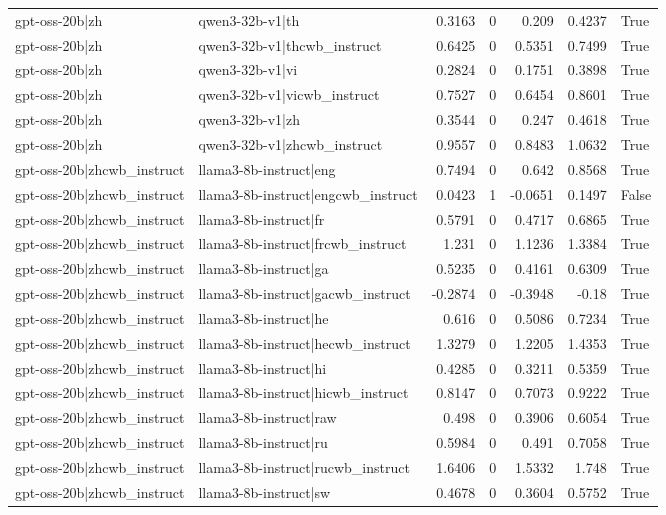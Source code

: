 \begin{table}
\begin{tabular}{l l r r r r l}
gpt-oss-20b|zh & qwen3-32b-v1|th & 0.3163 & 0 & 0.209 & 0.4237 & True \\
gpt-oss-20b|zh & qwen3-32b-v1|thcwb_instruct & 0.6425 & 0 & 0.5351 & 0.7499 & True \\
gpt-oss-20b|zh & qwen3-32b-v1|vi & 0.2824 & 0 & 0.1751 & 0.3898 & True \\
gpt-oss-20b|zh & qwen3-32b-v1|vicwb_instruct & 0.7527 & 0 & 0.6454 & 0.8601 & True \\
gpt-oss-20b|zh & qwen3-32b-v1|zh & 0.3544 & 0 & 0.247 & 0.4618 & True \\
gpt-oss-20b|zh & qwen3-32b-v1|zhcwb_instruct & 0.9557 & 0 & 0.8483 & 1.0632 & True \\
gpt-oss-20b|zhcwb_instruct & llama3-8b-instruct|eng & 0.7494 & 0 & 0.642 & 0.8568 & True \\
gpt-oss-20b|zhcwb_instruct & llama3-8b-instruct|engcwb_instruct & 0.0423 & 1 & -0.0651 & 0.1497 & False \\
gpt-oss-20b|zhcwb_instruct & llama3-8b-instruct|fr & 0.5791 & 0 & 0.4717 & 0.6865 & True \\
gpt-oss-20b|zhcwb_instruct & llama3-8b-instruct|frcwb_instruct & 1.231 & 0 & 1.1236 & 1.3384 & True \\
gpt-oss-20b|zhcwb_instruct & llama3-8b-instruct|ga & 0.5235 & 0 & 0.4161 & 0.6309 & True \\
gpt-oss-20b|zhcwb_instruct & llama3-8b-instruct|gacwb_instruct & -0.2874 & 0 & -0.3948 & -0.18 & True \\
gpt-oss-20b|zhcwb_instruct & llama3-8b-instruct|he & 0.616 & 0 & 0.5086 & 0.7234 & True \\
gpt-oss-20b|zhcwb_instruct & llama3-8b-instruct|hecwb_instruct & 1.3279 & 0 & 1.2205 & 1.4353 & True \\
gpt-oss-20b|zhcwb_instruct & llama3-8b-instruct|hi & 0.4285 & 0 & 0.3211 & 0.5359 & True \\
gpt-oss-20b|zhcwb_instruct & llama3-8b-instruct|hicwb_instruct & 0.8147 & 0 & 0.7073 & 0.9222 & True \\
gpt-oss-20b|zhcwb_instruct & llama3-8b-instruct|raw & 0.498 & 0 & 0.3906 & 0.6054 & True \\
gpt-oss-20b|zhcwb_instruct & llama3-8b-instruct|ru & 0.5984 & 0 & 0.491 & 0.7058 & True \\
gpt-oss-20b|zhcwb_instruct & llama3-8b-instruct|rucwb_instruct & 1.6406 & 0 & 1.5332 & 1.748 & True \\
gpt-oss-20b|zhcwb_instruct & llama3-8b-instruct|sw & 0.4678 & 0 & 0.3604 & 0.5752 & True \\

\end{tabular}
\end{table}
